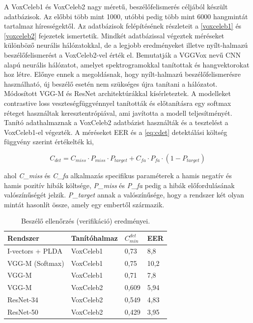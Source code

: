 A VoxCeleb1 és VoxCeleb2 nagy méretű, beszélőfelismerés céljából készült adatbázisok. Az előbbi több mint 1000, utóbbi pedig több mint 6000 hangmintát tartalmaz hírességektől. Az adatbázisok felépítésének részleteit a \ref{voxceleb1} és \ref{voxceleb2} fejezetek ismertetik. Mindkét adatbázissal végeztek méréseket különböző neurális hálózatokkal, de a legjobb eredményeket illetve nyílt-halmazú beszélőfelismerést a VoxCeleb2-vel érték el.
\newline
\newline
Bemutatják a VGGVox nevű CNN alapú neurális hálózatot, amelyet spektrogramokkal tanítottak és hangvektorokat hoz létre. Előnye ennek a megoldásnak, hogy nyílt-halmazú beszélőfelismerésre használható, új beszélő esetén nem szükséges újra tanítani a hálózatot. 
\newline
\newline
Módosított VGG-M és ResNet architektúrákkal kísérleteztek. A modelleket contrastive loss veszteségfüggvénnyel tanították és előtanításra egy softmax réteget használtak keresztentrópiával, ami javította a modell teljesítményét. Tanító adathalmaznak a VoxCeleb2 adatbázist használták és a tesztelést a VoxCeleb1-el végezték. A méréseket EER és a \ref{eq:cdet} detektálási költség függvény szerint értékelték ki,

\begin{equation} \label{eq:cdet}
C_{det} = C_{miss} \cdot P_{miss} \cdot P_{target} + C_{fa} \cdot P_{fa} \cdot (1 - P_{target})
\end{equation}

ahol \emph{C\_miss} és \emph{C\_fa} alkalmazás specifikus paraméterek a hamis negatív és hamis pozitív hibák költsége, \emph{P\_miss} és \emph{P\_fa} pedig a hibák előfordulásának valószínűségét jelzik. \emph{P\_target} annak a valószínűsége, hogy a rendszer két olyan mintát hasonlít össze, amely egy embertől származik.
\newline
\begin{table}[!ht]
	\begin{tabular}{*4l} \toprule
		\bfseries Rendszer & \bfseries Tanítóhalmaz & \bfseries $C_{min}^{det}$ & \bfseries EER \\ \midrule
		I-vectors + PLDA & VoxCeleb1 & 0,73 & 8,8 \\
		VGG-M (Softmax) & VoxCeleb1 & 0,75 & 10,2 \\
		VGG-M & VoxCeleb1 & 0,71 & 7,8 \\
		VGG-M  & VoxCeleb2 & 0,609 & 5,94 \\
		ResNet-34 & VoxCeleb2 & 0,549 & 4,83 \\
		ResNet-50 & VoxCeleb2 & 0,429 & 3,95 \\
		\bottomrule
		\hline
	\end{tabular}
	\centering
	\caption{Beszélő ellenőrzés (verifikáció) eredményei.}
	\label{fig:sincnet-verification}
\end{table}

